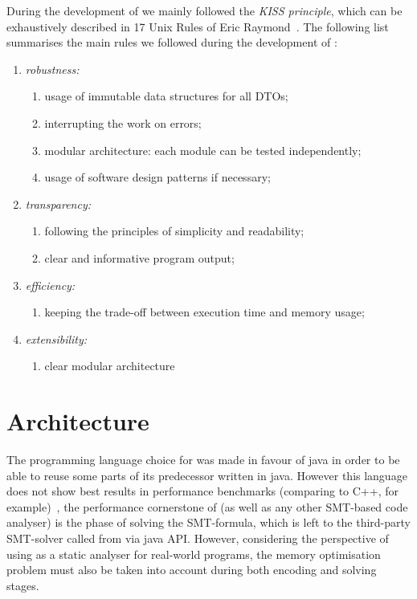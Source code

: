 During the development of \porthos[2] we mainly followed the \textit{KISS principle}, which can be exhaustively described in 17 Unix Rules of Eric Raymond~\cite{raymond2003art}.%
The following list summarises the main rules we followed during the development of \porthos[2]:

\begin{enumerate}[nolistsep]
  \item \textit{robustness:}
    \begin{enumerate}[label*=\arabic*.]
      \item usage of immutable data structures for all DTOs;
      \item interrupting the work on errors;
      \item modular architecture: each module can be tested independently;
      \item usage of software design patterns if necessary;
    \end{enumerate}
  \item \textit{transparency:}
    \begin{enumerate}[label*=\arabic*.]
      \item following the principles of simplicity and readability;
      \item clear and informative program output;
    \end{enumerate}
  \item \textit{efficiency:}
    \begin{enumerate}[label*=\arabic*.]%
      \item keeping the trade-off between execution time and memory usage;
    \end{enumerate}
  \item \textit{extensibility:}
    \begin{enumerate}[label*=\arabic*.]%
      \item clear modular architecture
    \end{enumerate}
\end{enumerate}


\section{Architecture} %
\label{ch:impl:arch}

The programming language choice for \porthos[2] was made in favour of java in order to be able to reuse some parts of its predecessor \porthos{} written in java.
However this language does not show best results in performance benchmarks (comparing to C++, for example)~\cite{TODO}, the performance cornerstone of \porthos[2] (as well as any other SMT-based code analyser) is the phase of solving the SMT-formula, which is left to the third-party SMT-solver called from \porthos[2] via java API.
However, considering the perspective of using \porthos[2] as a static analyser for real-world programs, the memory optimisation problem must also be taken into account during both encoding and solving stages.

